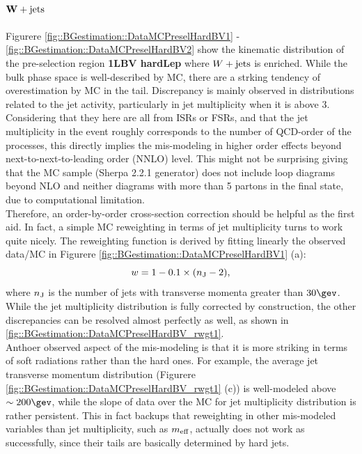 \paragraph{$\bf{W+\mathrm{jets}}$}
Figurere \ref{fig::BGestimation::DataMCPreselHardBV1} - \ref{fig::BGestimation::DataMCPreselHardBV2} show the kinematic distribution of the pre-selection region \textbf{1LBV hardLep} where $W+\mathrm{jets}$ is enriched. While the bulk phase space is well-described by MC, there are a strking tendency of overestimation by MC in the tail. Discrepancy is mainly observed in distributions related to the jet activity, particularly in jet multiplicity when it is above 3. Considering that they here are all from ISRs or FSRs, and that the jet multiplicity in the event roughly corresponds to the number of QCD-order of the processes, this directly implies the mis-modeling in higher order effects beyond next-to-next-to-leading order (NNLO) level. This might not be surprising giving that the MC sample (Sherpa 2.2.1 generator) does not include loop diagrams beyond NLO and neither diagrams with more than 5 partons in the final state, due to computational limitation. \\

Therefore, an order-by-order cross-section correction should be helpful as the first aid. In fact, a simple MC reweighting in terms of jet multiplicity turns to work quite nicely. The reweighting function is derived by fitting linearly the observed data/MC in Figurere \ref{fig::BGestimation::DataMCPreselHardBV1} (a):
\begin{equation}
w = 1 - 0.1 \times (n_{\mathrm{J}}-2) \label{eq::BGestimation::rwgt_nJ},
\end{equation}
where $n_{\mathrm{J}}$ is the number of jets with transverse momenta greater than $30\gev$. While the jet multiplicity distribution is fully corrected by construction, the other discrepancies can be resolved almost perfectly as well, as shown in \ref{fig::BGestimation::DataMCPreselHardBV_rwgt1}. \\

Anthoer observed aspect of the mis-modeling is that it is more striking in terms of soft radiations rather than the hard ones. For example, the average jet transverse momentum distribution (Figurere \ref{fig::BGestimation::DataMCPreselHardBV_rwgt1} (c)) is well-modeled above $\sim 200 \gev$, while the slope of data over the MC for jet multiplicity distribution is rather persistent. This in fact backups that reweighting in other mis-modeled variables than jet multiplicity, such as $m_{\mathrm{eff}}$, actually does not work as successfully, since their tails are basically determined by hard jets. \\

